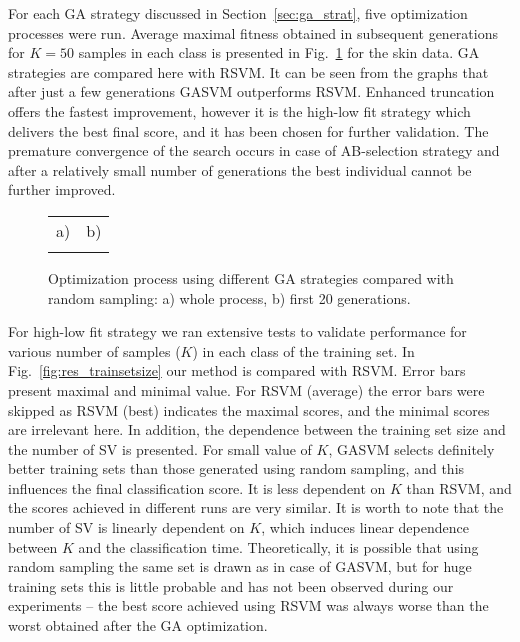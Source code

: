\documentclass{llncs}
\begin{document}
For each GA strategy discussed in Section~\ref{sec:ga_strat}, five
optimization processes were run. Average maximal fitness obtained in
subsequent generations for $K=50$ samples in each class is presented
in Fig.~\ref{fig:res_opt_process} for the skin data. GA strategies
are compared here with RSVM. It can be seen from the graphs that
after just a few generations GASVM outperforms RSVM. Enhanced
truncation offers the fastest improvement, however it is the
high-low fit strategy which delivers the best final score, and it
has been chosen for further validation. The premature convergence of
the search occurs in case of AB-selection strategy and after a
relatively small number of generations the best individual cannot be
further improved.
\begin{figure}[t]
\centering

\renewcommand{\tabcolsep}{0cm}
\newcommand{\myfigwidth}{0.315}
\newcommand{\raiseshift}{0mm}

\begin{tabular}{ll}

\scriptsize a) & \scriptsize b) \\
\\

\end{tabular}

  \caption
  {
    Optimization process using different GA strategies compared with
    random sampling: a) whole process, b) first 20 generations.
  }
  \label{fig:res_opt_process}
\end{figure}

For high-low fit strategy we ran extensive tests to validate
performance for various number of samples ($K$) in each class of the
training set. In Fig.~\ref{fig:res_trainsetsize} our method is
compared with RSVM. Error bars present maximal and minimal value.
For RSVM (average) the error bars were skipped as RSVM (best)
indicates the maximal scores, and the minimal scores are irrelevant
here. In addition, the dependence between the training set size and
the number of SV is presented. For small value of $K$, GASVM selects
definitely better training sets than those generated using random
sampling, and this influences the final classification score. It is
less dependent on $K$ than RSVM, and the scores achieved in
different runs are very similar. It is worth to note that the number
of SV is linearly dependent on $K$, which induces linear
dependence between $K$ and the classification time. Theoretically,
it is possible that using random sampling the same set is drawn as
in case of GASVM, but for huge training sets this is little
probable and has not been observed during our experiments%
 -- the best score achieved using RSVM was
always worse than the worst obtained after the GA optimization.
\end{document}
